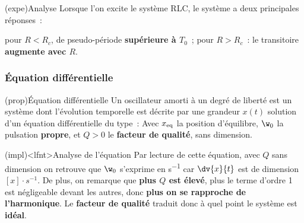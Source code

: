 \documentclass[../../main/main.tex]{subfiles}
\begin{document}
\begin{tcb}(expe){Analyse}
	Lorsque l'on excite le système RLC, le système a deux principales réponses~:
	\begin{enumerate}
		 pour $R < R_{c}$, de pseudo-période \textbf{supérieure à
			$T_0$}~;
		 pour $R > R_c$~: le transitoire
		\textbf{augmente avec $R$}.
	\end{enumerate}
\end{tcb}

\subsubsection{Équation différentielle}

\begin{tcb}[label=prop:eqdiffoh](prop){Équation différentielle}
	Un oscillateur amorti à un degré de liberté est un système dont l'évolution
	temporelle est décrite par une grandeur $x(t)$ solution d'un équation
	différentielle du type~:
	\psw{
	\[
		\boxed{
		\dv[2]{x}{t} + \frac{\w_0}{Q} \dv{x}{t} + \w_0{}^2x =
		\w_0{}^2x_{\rm eq}
		}
	\]
	}
	Avec $x_{\rm eq}$ la position d'équilibre, $\w_0$ la pulsation
	\textbf{propre}, et $Q >0$ le \textbf{facteur de qualité}, sans dimension.
\end{tcb}
\begin{tcb}[label=impl:eqdiffamorti](impl)<lfnt>{Analyse de l'équation}
	Par lecture de cette équation, avec $Q$ sans dimension on retrouve que
	$\w_0$ s'exprime en \si{s^{-1}} car $\dv{x}{t}$ est de dimension
	$[x]\cdot\si{s^{-1}}$.
	\bigbreak
	De plus, on remarque que \textbf{plus $Q$ est élevé}, plus le terme
	d'ordre 1 est négligeable devant les autres, donc \textbf{plus on se
		rapproche de l'harmonique}.
	\bigbreak
	Le \textbf{facteur de qualité} traduit donc à quel
	point le système est \textbf{idéal}.
\end{tcb}
\end{document}
